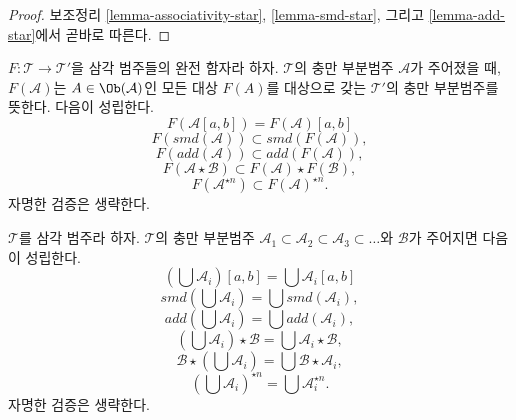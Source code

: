 \begin{proof}
보조정리 \ref{lemma-associativity-star}, \ref{lemma-smd-star}, 그리고
\ref{lemma-add-star}에서 곧바로 따른다.
\end{proof}

\begin{remark}
\label{remark-operations-functor}
$F : \mathcal{T} \to \mathcal{T}'$을 삼각 범주들의 완전 함자라 하자.
$\mathcal{T}$의 충만 부분범주 $\mathcal{A}$가 주어졌을 때,
$F(\mathcal{A})$는 $A \in \Ob(\mathcal{A})$인 모든 대상 $F(A)$를
대상으로 갖는 $\mathcal{T}'$의 충만 부분범주를 뜻한다. 다음이 성립한다.
$$
F(\mathcal{A}[a, b]) = F(\mathcal{A})[a, b]
$$
$$
F(smd(\mathcal{A})) \subset smd(F(\mathcal{A})),
$$
$$
F(add(\mathcal{A})) \subset add(F(\mathcal{A})),
$$
$$
F(\mathcal{A} \star \mathcal{B}) \subset F(\mathcal{A}) \star F(\mathcal{B}),
$$
$$
F(\mathcal{A}^{\star n}) \subset F(\mathcal{A})^{\star n}.
$$
자명한 검증은 생략한다.
\end{remark}

\begin{remark}
\label{remark-operations-unions}
$\mathcal{T}$를 삼각 범주라 하자. $\mathcal{T}$의 충만 부분범주
$\mathcal{A}_1 \subset \mathcal{A}_2 \subset \mathcal{A}_3 \subset \ldots$와
$\mathcal{B}$가 주어지면 다음이 성립한다.
$$
\left(\bigcup \mathcal{A}_i\right)[a, b] = \bigcup \mathcal{A}_i[a, b]
$$
$$
smd\left(\bigcup \mathcal{A}_i\right) = \bigcup smd(\mathcal{A}_i),
$$
$$
add\left(\bigcup \mathcal{A}_i\right) = \bigcup add(\mathcal{A}_i),
$$
$$
\left(\bigcup \mathcal{A}_i\right) \star \mathcal{B} =
\bigcup \mathcal{A}_i \star \mathcal{B},
$$
$$
\mathcal{B} \star \left(\bigcup \mathcal{A}_i\right) =
\bigcup \mathcal{B} \star \mathcal{A}_i,
$$
$$
\left(\bigcup \mathcal{A}_i\right)^{\star n} =
\bigcup \mathcal{A}_i^{\star n}.
$$
자명한 검증은 생략한다.
\end{remark}

